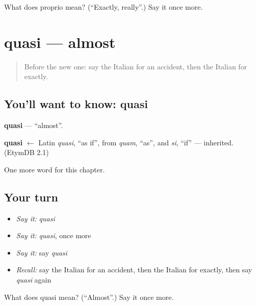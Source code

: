\begin{tcolorbox}[breakable,colback=teal!4,colframe=teal!35!black,title={Before you move on}]
What does proprio mean? (\textquotedblleft{}Exactly, really\textquotedblright{}.) Say it once more.
\end{tcolorbox}
\section[quasi]{quasi — almost}

\label{lesson:IT-C244-quasi}



\begin{quote}
Before the new one: say the Italian for an accident, then the Italian for exactly.
\end{quote}

\subsection*{You'll want to know: quasi}
\textbf{quasi} — \textquotedblleft{}almost\textquotedblright{}.

\begin{cousinweb}
\textbf{quasi} $\leftarrow$ Latin \emph{quasi}, \textquotedblleft{}as if\textquotedblright{}, from \emph{quam}, \textquotedblleft{}as\textquotedblright{}, and \emph{si}, \textquotedblleft{}if\textquotedblright{} — inherited. (EtymDB 2.1)
\end{cousinweb}

\begin{grammarlens}[title={What you've built}]
One more word for this chapter.
\end{grammarlens}

\subsection*{Your turn}
\begin{itemize}
\raggedright
  \item \emph{Say it:} \emph{quasi}
  \item \emph{Say it:} \emph{quasi}, once more
  \item \emph{Say it:} say \emph{quasi}
  \item \emph{Recall:} say the Italian for an accident, then the Italian for exactly, then say \emph{quasi} again
\end{itemize}

\begin{tcolorbox}[breakable,colback=teal!4,colframe=teal!35!black,title={Before you move on}]
What does quasi mean? (\textquotedblleft{}Almost\textquotedblright{}.) Say it once more.
\end{tcolorbox}
